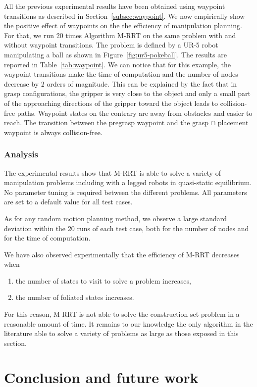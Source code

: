 All the previous experimental results have been obtained using
waypoint transitions as described in Section~\ref{subsec:waypoint}. We
now empirically show the positive effect of waypoints on the the
efficiency of manipulation planning. For that, we run 20 times
Algorithm M-RRT on the same problem with and without waypoint
transitions.  The problem is defined by a UR-5 robot manipulating a
ball as shown in Figure~\ref{fig:ur5-pokeball}. The results are
reported in Table~\ref{tab:waypoint}. We can notice that for this
example, the waypoint transitions make the time of computation and the
number of nodes decrease by 2 orders of magnitude. This can be
explained by the fact that in grasp configurations, the gripper is
very close to the object and only a small part of the approaching
directions of the gripper toward the object leads to collision-free
paths. Waypoint states on the contrary are away from obstacles and
easier to reach. The transition between the pregrasp waypoint and the
grasp $\cap$ placement waypoint is always collision-free.

\subsubsection{Analysis}

The experimental results show that M-RRT is able to solve a variety of
manipulation problems including with a legged robots in quasi-static
equilibrium. No parameter tuning is required between the different problems. All
parameters are set to a default value for all test cases.

As for any random motion planning method, we observe a large standard
deviation within the 20 runs of each test case, both for the number of nodes
and for the time of computation.

We have also observed experimentally that the efficiency of M-RRT decreases
when
\begin{enumerate}
\item the number of states to visit to solve a problem increases,
\item the number of foliated states increases.
\end{enumerate}
For this reason, M-RRT is not able to solve the construction set
problem in a reasonable amount of time. It remains to our knowledge
the only algorithm in the literature able to solve a variety of
problems as large as those exposed in this section.

\section{Conclusion and future work}


